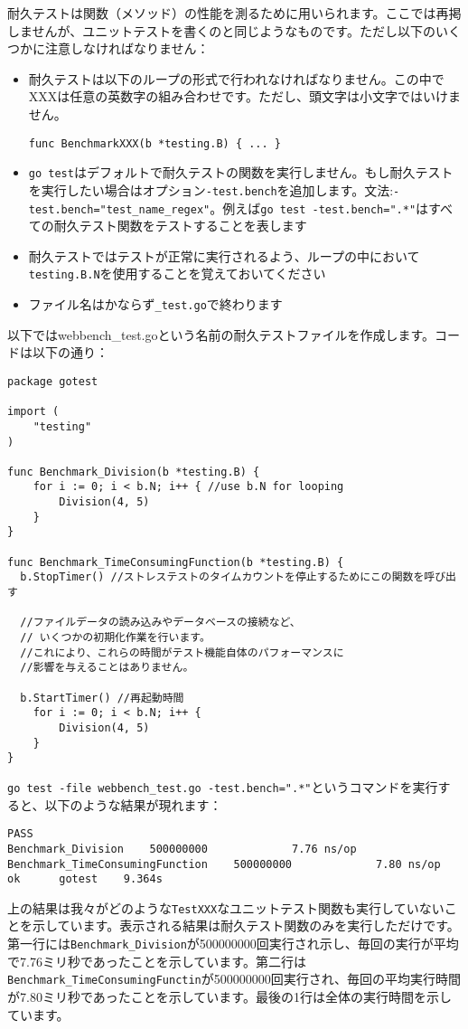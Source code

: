 耐久テストは関数（メソッド）の性能を測るために用いられます。ここでは再掲しませんが、ユニットテストを書くのと同じようなものです。ただし以下のいくつかに注意しなければなりません：

\begin{itemize}
  \item 耐久テストは以下のループの形式で行われなければなりません。この中でXXXは任意の英数字の組み合わせです。ただし、頭文字は小文字ではいけません。
\begin{lstlisting}[numbers=none]
func BenchmarkXXX(b *testing.B) { ... }
\end{lstlisting}
  \item \texttt{go test}はデフォルトで耐久テストの関数を実行しません。もし耐久テストを実行したい場合はオプション\texttt{-test.bench}を追加します。文法:\texttt{-test.bench="test\_name\_regex"}。例えば\texttt{go test -test.bench=".*"}はすべての耐久テスト関数をテストすることを表します
  \item 耐久テストではテストが正常に実行されるよう、ループの中において\texttt{testing.B.N}を使用することを覚えておいてください
  \item ファイル名はかならず\texttt{\_test.go}で終わります
\end{itemize}

以下ではwebbench\_test.goという名前の耐久テストファイルを作成します。コードは以下の通り：

\begin{lstlisting}[numbers=none]
package gotest

import (
    "testing"
)

func Benchmark_Division(b *testing.B) {
    for i := 0; i < b.N; i++ { //use b.N for looping 
        Division(4, 5)
    }
}

func Benchmark_TimeConsumingFunction(b *testing.B) {
  b.StopTimer() //ストレステストのタイムカウントを停止するためにこの関数を呼び出す

  //ファイルデータの読み込みやデータベースの接続など、
  // いくつかの初期化作業を行います。
  //これにより、これらの時間がテスト機能自体のパフォーマンスに
  //影響を与えることはありません。

  b.StartTimer() //再起動時間
    for i := 0; i < b.N; i++ {
        Division(4, 5)
    }
}
\end{lstlisting}

\texttt{go test -file webbench\_test.go -test.bench=".*"}というコマンドを実行すると、以下のような結果が現れます：



\begin{lstlisting}[numbers=none]
PASS
Benchmark_Division    500000000             7.76 ns/op
Benchmark_TimeConsumingFunction    500000000             7.80 ns/op
ok      gotest    9.364s    
\end{lstlisting}


上の結果は我々がどのような\texttt{TestXXX}なユニットテスト関数も実行していないことを示しています。表示される結果は耐久テスト関数のみを実行しただけです。第一行には\texttt{Benchmark\_Division}が500000000回実行され示し、毎回の実行が平均で7.76ミリ秒であったことを示しています。第二行は\texttt{Benchmark\_TimeConsumingFunctin}が500000000回実行され、毎回の平均実行時間が7.80ミリ秒であったことを示しています。最後の1行は全体の実行時間を示しています。
